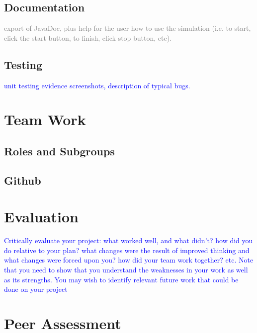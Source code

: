 \documentclass{article}
\begin{document}
	\subsection{Documentation}
		\textcolor{gray}{export of JavaDoc, plus help for the user how to use the simulation (i.e. to start, click the start button, to finish, click stop button, etc).}
		
		
	\subsection{Testing}
		\textcolor{blue}{unit testing evidence screenshots, description of typical bugs.}

\section{Team Work}
	\subsection{Roles and Subgroups}
	\subsection{Github}
\section{Evaluation}
	\textcolor{blue}{Critically evaluate your project: what worked well, and what didn't? 
	how did you do relative to your plan? 
	what changes were the result of improved thinking and what changes were forced upon you? 
	how did your team work together? etc. 
	Note that you need to show that you understand the weaknesses in your work as well as its strengths. You may wish to identify relevant future work that could be done on your project}
	
	
\section{Peer Assessment}

	


\end{document}
